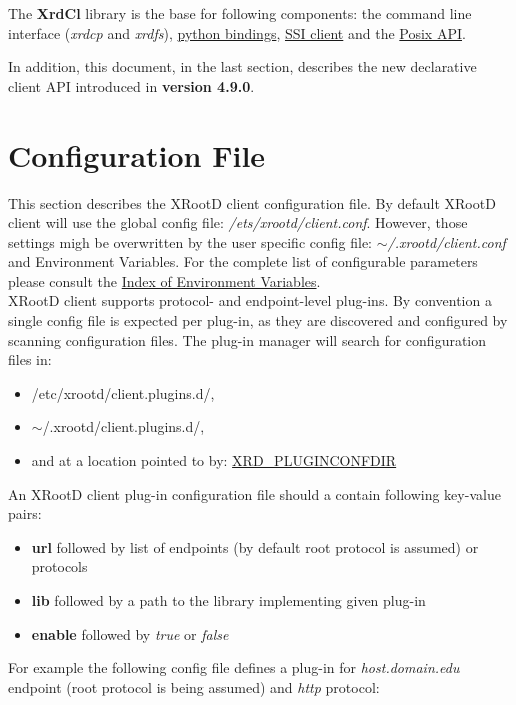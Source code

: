\documentclass{article}
\begin{document}
	The \textbf{XrdCl} library is the base for following components: the command line interface (\textit{xrdcp} and \textit{xrdfs}), 
	\href{http://xrootd.org/doc/python/xrootd-python/}{python bindings}, \href{http://xrootd.org/doc/dev49/ssi_reference-V2.htm}{SSI client} 
	and the \href{http://xrootd.org/doc/dev49/pss_config.htm#_Toc525070693}{Posix API}.
	
	In addition, this document, in the last section, describes the new declarative client API introduced in \textbf{version 4.9.0}.

\section{Configuration File}

	This section describes the XRootD client configuration file. By default XRootD client will use
	the global config file: \textit{/ets/xrootd/client.conf}. However, those settings migh be overwritten
	by the user specific config file: \textit{$\sim$/.xrootd/client.conf} and Environment Variables. For 
	the complete list of configurable parameters please consult the \hyperref[sec:envar]	
	{Index of Environment Variables}. \\
	XRootD client supports protocol- and endpoint-level plug-ins. By convention a single config file is 
	expected per plug-in, as they are discovered and configured by scanning configuration files. The
	plug-in manager will search for configuration files in:
	\begin{itemize}
	  \item /etc/xrootd/client.plugins.d/,
	  \item $\sim$/.xrootd/client.plugins.d/,
	  \item and at a location pointed to by: \hyperref[env:pluginconfigdir]{XRD_PLUGINCONFDIR}
	\end{itemize}
	An XRootD client plug-in configuration file should a contain following key-value pairs:
	\begin{itemize}
	  \item \textbf{url} followed by list of endpoints (by default root protocol is assumed) or protocols
	  \item \textbf{lib} followed by a path to the library implementing given plug-in
	  \item \textbf{enable} followed by \textit{true} or \textit{false} 
	\end{itemize}
	For example the following config file defines a plug-in for \textit{host.domain.edu} endpoint (root 
	protocol is being assumed) and \textit{http} protocol:
	
\end{document}
